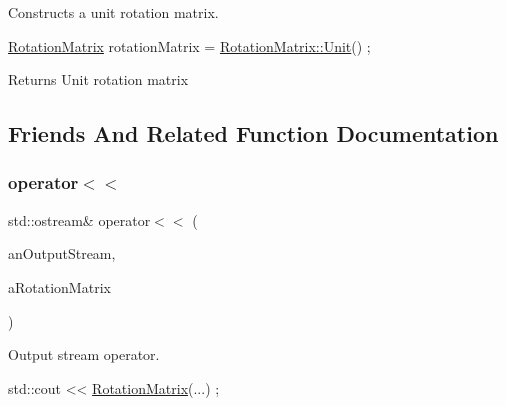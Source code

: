 Constructs a unit rotation matrix. 


\begin{DoxyCode}
\hyperlink{classostk_1_1math_1_1geom_1_1d3_1_1trf_1_1rot_1_1_rotation_matrix_a5e6bed0779ad7db0c5bf26b2bd96f8ba}{RotationMatrix} rotationMatrix = \hyperlink{classostk_1_1math_1_1geom_1_1d3_1_1trf_1_1rot_1_1_rotation_matrix_a37c25a2ddaa1dcd24be8dd568259a9b8}{RotationMatrix::Unit}() ;
\end{DoxyCode}


\begin{DoxyReturn}{Returns}
Unit rotation matrix 
\end{DoxyReturn}


\subsection{Friends And Related Function Documentation}
\mbox{\label{classostk_1_1math_1_1geom_1_1d3_1_1trf_1_1rot_1_1_rotation_matrix_aa9ed0897a6219331deeb7750017a0df9}} 
\subsubsection{\texorpdfstring{operator$<$$<$}{operator<<}}
{\footnotesize\ttfamily std\+::ostream\& operator$<$$<$ (\begin{DoxyParamCaption}\item[{std\+::ostream \&}]{an\+Output\+Stream,  }\item[{const \hyperlink{classostk_1_1math_1_1geom_1_1d3_1_1trf_1_1rot_1_1_rotation_matrix}{Rotation\+Matrix} \&}]{a\+Rotation\+Matrix }\end{DoxyParamCaption})\hspace{0.3cm}{\ttfamily [friend]}}



Output stream operator. 


\begin{DoxyCode}
std::cout << \hyperlink{classostk_1_1math_1_1geom_1_1d3_1_1trf_1_1rot_1_1_rotation_matrix_a5e6bed0779ad7db0c5bf26b2bd96f8ba}{RotationMatrix}(...) ;
\end{DoxyCode}



